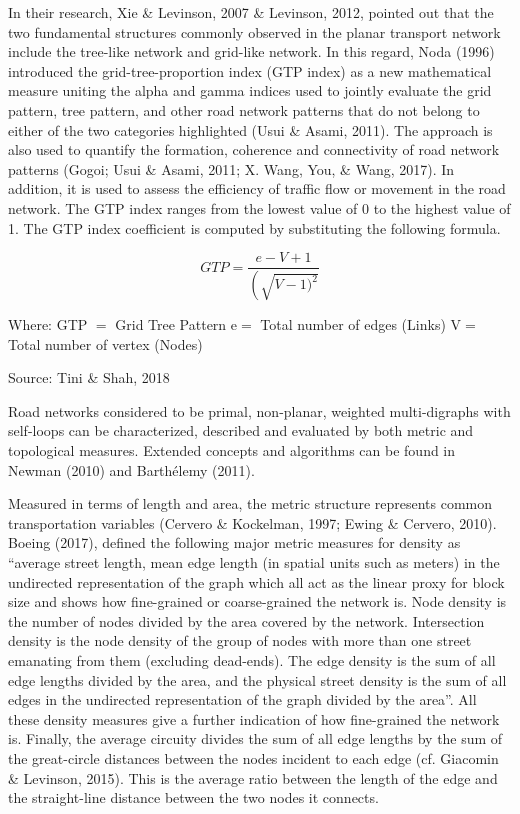 In their research, Xie \& Levinson, 2007 \& Levinson, 2012, pointed out that the two fundamental structures commonly observed in the planar transport network include the tree-like network and grid-like network. In this regard, Noda (1996) introduced the grid-tree-proportion index (GTP index) as a new mathematical measure uniting the alpha and gamma indices used to jointly evaluate the grid pattern, tree pattern, and other road network patterns that do not belong to either of the two categories  highlighted (Usui \& Asami, 2011). The approach is also used to quantify the formation, coherence and connectivity of road network patterns (Gogoi; Usui \& Asami, 2011; X. Wang, You, & Wang, 2017). In addition, it is used to assess the efficiency of traffic flow or movement in the road network. The GTP index ranges from the lowest value of 0 to the highest value of 1. The GTP index coefficient is computed by substituting the following formula.

\begin{equation}
{GTP}=\frac{e-V+1}{\left(\sqrt{V-1)^{2}}\right.}
\end{equation}

Where:
GTP $=$ Grid Tree Pattern
$\mathrm{e}=$ Total number of edges (Links)
$\mathrm{V}=$ Total number of vertex (Nodes)
\caption{Source: Tini \& Shah, 2018}

Road networks considered to be primal, non-planar, weighted multi-digraphs with self-loops can be characterized, described and evaluated by both metric and topological measures. Extended concepts and algorithms can be found in Newman (2010) and Barthélemy (2011). 

Measured in terms of length and area, the metric structure represents common transportation variables (Cervero \& Kockelman, 1997; Ewing \& Cervero, 2010). Boeing (2017), defined the following major metric measures for density as “average street length, mean edge length (in spatial units such as meters) in the undirected representation of the graph which all act as the linear proxy for block size and shows how fine-grained or coarse-grained the network is. Node density is the number of nodes divided by the area covered by the network. Intersection density is the node density of the group of nodes with more than one street emanating from them (excluding dead-ends). The edge density is the sum of all edge lengths divided by the area, and the physical street density is the sum of all edges in the undirected representation of the graph divided by the area”. All these density measures give a further indication of how fine-grained the network is. Finally, the average circuity divides the sum of all edge lengths by the sum of the great-circle distances between the nodes incident to each edge (cf. Giacomin \& Levinson, 2015). This is the average ratio between the length of the edge and the straight-line distance between the two nodes it connects.

